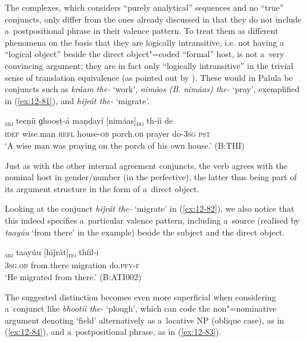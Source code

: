 The complexes, which \citet[201]{verma1993} considers ``purely analytical'' sequences and no ``true'' conjuncts, only differ from the ones already discussed in that they do not include a~postpositional phrase in their valence pattern. To treat them as different phenomena on the basis that they are logically intransitive, i.e. not having a ``logical object'' beside the direct object"=coded ``formal'' host, is not a~very convincing argument; they are in fact only ``logically intransitive'' in the trivial sense of translation equivalence (as pointed out by \citealt[157]{masica1993}). These would in Palula be conjuncts such as \textit{kráam the-} `work', \textit{nimóos (B.} \textit{nimáas) the-} `pray', exemplified in (\ref{ex:12-81}), and \textit{hiǰrát the-} `migrate'. 

\begin{exe}
\ex
\label{ex:12-81}
\gll [ak buzrúɡ]\textsubscript{\textsc{sbj}} teeṇíi ɡhooṣṭ-á maṇḍayí [nimáas]\textsubscript{\textsc{do}} th-íi de \\
\textsc{idef} wise.man \textsc{refl} house-\textsc{ob} porch.\textsc{ob}  prayer do-\textsc{3sg} \textsc{pst} \\
\glt `A wise man was praying on the porch of his own house.' (B:THI)
\end{exe}

Just as with the other internal agreement conjuncts, the verb agrees with the nominal host in gender/number (in the perfective), the latter thus being part of its argument structure in the form of a~direct object. 


Looking at the conjunct \textit{hiǰrát the-} `migrate' in (\ref{ex:12-82}), we also notice that this indeed specifies a~particular valence pattern, including a~source (realised by \textit{taayúu} `from there' in the example) beside the subject and the direct object. 

\begin{exe}
\ex
\label{ex:12-82}
\gll [tíi]\textsubscript{\textsc{sbj}} taayúu [hiǰrát]\textsubscript{\textsc{do}} thíil-i  \\
\textsc{3sg.ob} from.there migration do.\textsc{pfv-f} \\
\glt `He migrated from there.' (B:ATI002)
\end{exe}

The suggested distinction becomes even more superficial when considering a~conjunct like \textit{bhootíi the-} `plough', which can code the non"=nominative argument denoting `field' alternatively as a~locative NP (oblique case), as in (\ref{ex:12-84}), and a~postpositional phrase, as in (\ref{ex:12-83}).

